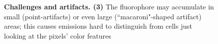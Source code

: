\begin{landscape}
\begin{figure}[ht]\ContinuedFloat
    \centering
    \caption{\textbf{Challenges and artifacts. (3)}
    The fluorophore may accumulate in small (point-artifacts) or even large (``macaroni"-shaped artifact) areas; this causes emissions hard to distinguish from cells just looking at the pixels' color features
    }
\end{figure}
\end{landscape}
\clearpage
\restoregeometry